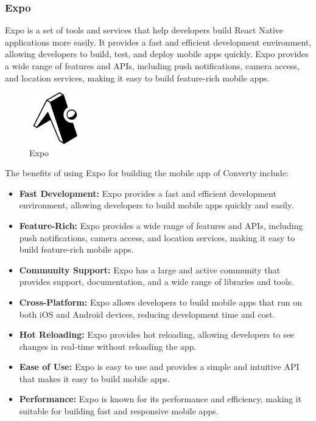 \subsubsection{Expo}
Expo is a set of tools and services that help developers build React Native applications more easily. It provides a fast and efficient development environment, allowing developers to build, test, and deploy mobile apps quickly. Expo provides a wide range of features and APIs, including push notifications, camera access, and location services, making it easy to build feature-rich mobile apps.

\begin{figure}[H]
    \centering
    \includegraphics[width=0.2\textwidth]{Images/expo.png}
    \caption{Expo}
    \label{fig:expo}
\end{figure}

The benefits of using Expo for building the mobile app of Converty include:

\begin{itemize}
    \item \textbf{Fast Development:} Expo provides a fast and efficient development environment, allowing developers to build mobile apps quickly and easily.
    \item \textbf{Feature-Rich:} Expo provides a wide range of features and APIs, including push notifications, camera access, and location services, making it easy to build feature-rich mobile apps.
    \item \textbf{Community Support:} Expo has a large and active community that provides support, documentation, and a wide range of libraries and tools.
    \item \textbf{Cross-Platform:} Expo allows developers to build mobile apps that run on both iOS and Android devices, reducing development time and cost.
    \item \textbf{Hot Reloading:} Expo provides hot reloading, allowing developers to see changes in real-time without reloading the app.
    \item \textbf{Ease of Use:} Expo is easy to use and provides a simple and intuitive API that makes it easy to build mobile apps.
    \item \textbf{Performance:} Expo is known for its performance and efficiency, making it suitable for building fast and responsive mobile apps.
\end{itemize}


